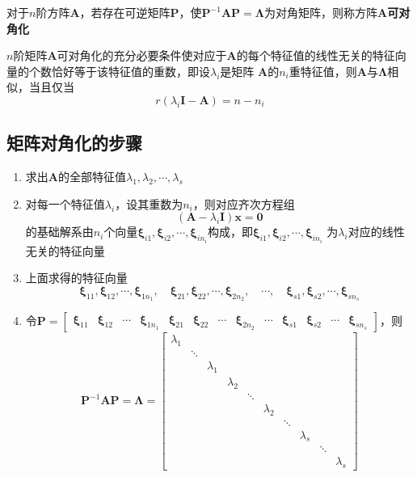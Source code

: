 \documentclass[UTF8]{ctexart}
\newcommand{\ve}[1]{{\bm{#1}}}
\newcommand{\mat}[1]{\ve{#1}}
\newcommand{\emplin}{\vspace{1em}}
\begin{document}
\emplin

对于$n$阶方阵$\mat{A}$，若存在可逆矩阵$\mat{P}$，使$\mat{P}^{-1}\mat{A}\mat{P}=\mat{\Lambda}$为对角矩阵，则称方阵$\mat{A}$\textbf{可对角化}

\emplin
\emplin

$n$阶矩阵$\mat{A}$可对角化的充分必要条件使对应于$\mat{A}$的每个特征值的线性无关的特征向量的个数恰好等于该特征值的重数，即设$\lambda_i$是矩阵
$\mat{A}$的$n_i$重特征值，则$\mat{A}$与$\mat{\Lambda}$相似，当且仅当
\[ r(\lambda_i\mat{I}-\mat{A})=n-n_i \]

\subsection*{矩阵对角化的步骤}
\begin{enumerate}
  \item 求出$\mat{A}$的全部特征值$\lambda_1,\lambda_2,\cdots,\lambda_s$
  \item 对每一个特征值$\lambda_i$，设其重数为$n_i$，则对应齐次方程组
  \[(\mat{A}-\lambda_i\mat{I})\mat{x}=\mat{0}\]
  的基础解系由$n_i$个向量$\mat{\xi}_{i1},\mat{\xi}_{i2},\cdots,\mat{\xi}_{in_i}$构成，即$\mat{\xi}_{i1},\mat{\xi}_{i2},\cdots,\mat{\xi}_{in_i}$
  为$\lambda_i$对应的线性无关的特征向量
  \item 上面求得的特征向量
  \[
  \mat{\xi}_{11},\mat{\xi}_{12},\cdots,\mat{\xi}_{1n_1},\quad
  \mat{\xi}_{21},\mat{\xi}_{22},\cdots,\mat{\xi}_{2n_2},\quad
  \cdots,\quad
  \mat{\xi}_{s1},\mat{\xi}_{s2},\cdots,\mat{\xi}_{sn_s}
  \]
  \item 令$\mat{P}=\begin{bmatrix}\mat{\xi}_{11}&\mat{\xi}_{12}&\cdots&\mat{\xi}_{1n_1}&\mat{\xi}_{21}&\mat{\xi}_{22}&\cdots&\mat{\xi}_{2n_2}&
  \cdots&\mat{\xi}_{s1}&\mat{\xi}_{s2}&\cdots&\mat{\xi}_{sn_s}\end{bmatrix}$，则
  \[\mat{P}^{-1}\mat{A}\mat{P}=\mat{\Lambda}=\begin{bmatrix}
  \lambda_1\\
  &\ddots\\
  &&\lambda_1\\
  &&&\lambda_2\\
  &&&&\ddots\\
  &&&&&\lambda_2\\
  &&&&&&\ddots\\
  &&&&&&&\lambda_s\\
  &&&&&&&&\ddots\\
  &&&&&&&&&\lambda_s
  \end{bmatrix}\]
\end{enumerate}
\end{document}
